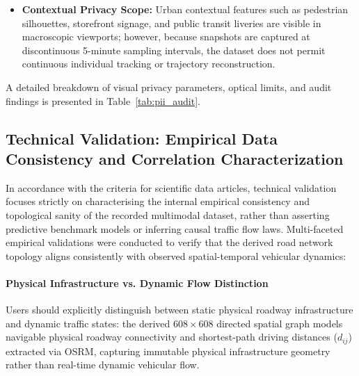 \documentclass[preprint,12pt]{elsarticle}
\begin{document}
\begin{itemize}
    \begin{equation}
        p_{\text{worst}} \le \frac{3}{1,000} = 0.30\% \quad (3.0 \times 10^{-3}), \qquad p_{\text{random}} \le \frac{3}{2,000} = 0.15\% \quad (1.5 \times 10^{-3}).
    \end{equation}
    Crucially, privacy assurance does not depend on automated detectors alone, but is anchored upon a tripartite defense: (i) physical sub-Nyquist optics ($\text{GSD} \ge 1.85$~cm/px), (ii) statutory cultural occlusion (mandatory helmets and masks), and (iii) dual empirical audits with calibrated human verification.
    \item \textbf{Contextual Privacy Scope:} Urban contextual features such as pedestrian silhouettes, storefront signage, and public transit liveries are visible in macroscopic viewports; however, because snapshots are captured at discontinuous 5-minute sampling intervals, the dataset does not permit continuous individual tracking or trajectory reconstruction.
\end{itemize}

A detailed breakdown of visual privacy parameters, optical limits, and audit findings is presented in Table~\ref{tab:pii_audit}.


\clearpage

\subsection{Technical Validation: Empirical Data Consistency and Correlation Characterization}
\label{sec:technical_validation}
In accordance with the criteria for scientific data articles, technical validation focuses strictly on characterising the internal empirical consistency and topological sanity of the recorded multimodal dataset, rather than asserting predictive benchmark models or inferring causal traffic flow laws. Multi-faceted empirical validations were conducted to verify that the derived road network topology aligns consistently with observed spatial-temporal vehicular dynamics:

\paragraph{Physical Infrastructure vs. Dynamic Flow Distinction}
Users should explicitly distinguish between static physical roadway infrastructure and dynamic traffic states: the derived $608 \times 608$ directed spatial graph models navigable physical roadway connectivity and shortest-path driving distances ($d_{ij}$) extracted via OSRM, capturing immutable physical infrastructure geometry rather than real-time dynamic vehicular flow.
\end{document}
